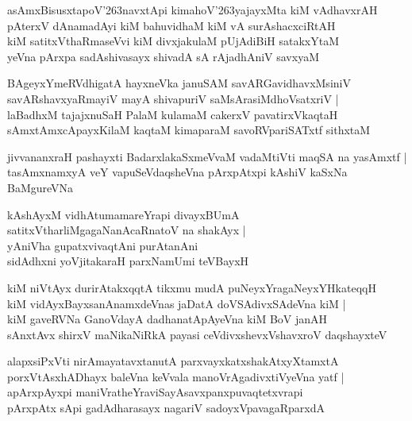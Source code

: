 \documentclass[twoside,12pt,openright]{book}
\def\S{\char'263}
\newcounter{shloka}[chapter]
\begin{document}
\begin{shloka}%
asAmxBisusxtapoV\S navxtApi kimahoV\S yajayxMta kiM vAdhavxrAH \\
pAterxV dAnamadAyi kiM bahuvidhaM kiM vA surAshacxciRtAH \\
kiM satitxVthaRmaseVvi kiM divxjakulaM pUjAdiBiH satakxYtaM \\
yeVna pArxpa sadAshivasayx shivadA sA rAjadhAniV savxyaM
\end{shloka}

\begin{shloka}%
BAgeyxYmeRVdhigatA hayxneVka januSAM savARGavidhavxMsiniV \\
savARshavxyaRmayiV mayA shivapuriV saMsArasiMdhoVsatxriV |\\
laBadhxM tajajxnuSaH PalaM kulamaM cakerxV pavatirxVkaqtaH \\
sAmxtAmxcApayxKilaM kaqtaM kimaparaM savoRVpariSATxtf sithxtaM 
\end{shloka}

\begin{shloka}%
jivvananxraH pashayxti BadarxlakaSxmeVvaM vadaMtiVti maqSA na yasAmxtf |\\
tasAmxnamxyA veY vapuSeVdaqsheVna pArxpAtxpi kAshiV kaSxNa BaMgureVNa\\
\end{shloka}

\begin{shloka}%
kAshAyxM vidhAtumamareYrapi divayxBUmA \\
satitxVtharliMgagaNanAcaRnatoV na shakAyx |\\
yAniVha gupatxvivaqtAni purAtanAni \\
sidAdhxni yoVjitakaraH parxNamUmi teVBayxH 
\end{shloka}

\begin{shloka}%
kiM niVtAyx durirAtakxqqtA tikxmu mudA puNeyxYragaNeyxYHkateqqH \\
kiM vidAyxBayxsanAnamxdeVnas jaDatA doVSAdivxSAdeVna kiM |\\
kiM gaveRVNa GanoVdayA dadhanatApAyeVna kiM BoV janAH \\
sAnxtAvx shirxV maNikaNiRkA payasi ceVdivxshevxVshavxroV daqshayxteV
\end{shloka}

\begin{shloka}%
alapxsiPxVti nirAmayatavxtanutA parxvayxkatxshakAtxyXtamxtA \\
porxVtAsxhADhayx baleVna keVvala manoVrAgadivxtiVyeVna yatf |\\
apArxpAyxpi maniVratheYraviSayAsavxpanxpuvaqtetxvrapi \\
pArxpAtx sApi gadAdharasayx nagariV sadoyxVpavagaRparxdA
\end{shloka}
\end{document}
